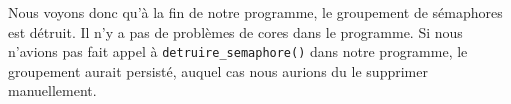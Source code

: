 Nous voyons donc qu'à la fin de notre programme, le groupement de sémaphores est détruit. Il n'y a pas de problèmes de \og cores\fg{} dans le programme. Si nous n'avions pas fait appel à \lstinline{detruire_semaphore()} dans notre programme, le groupement aurait persisté, auquel cas nous aurions du le supprimer manuellement.